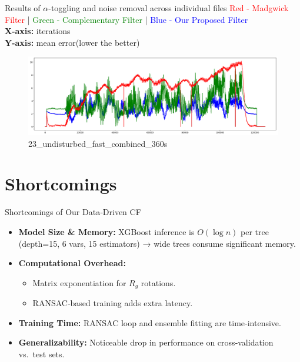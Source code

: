 \documentclass[aspectratio=169,xcolor=dvipsnames]{beamer}
\begin{document}
\begin{frame}{Results of $\alpha$-toggling and noise removal across individual files}
\small
\textcolor{red}{Red - Madgwick Filter} | \textcolor{green}{Green - Complementary Filter} | \textcolor{blue}{Blue - Our Proposed Filter} \\ 
\textbf{X-axis:} iterations \\ \textbf{Y-axis:} mean error(lower the better)

\begin{figure}
    \centering
    \includegraphics[width=1\linewidth]{logos/23_undisturbed_fast_combined_360s.png}
    \caption{23\_undisturbed\_fast\_combined\_360s}
    \label{fig:23_undisturbed360}
\end{figure}
\hfill
\end{frame}

\section{Shortcomings}

\begin{frame}{Shortcomings of Our Data‐Driven CF}
\begin{itemize}
  \item \textbf{Model Size \& Memory:}
    XGBoost inference is $O(\log n)$ per tree (depth=15, 6 vars, 15 estimators) → wide trees consume significant memory.
  \item \textbf{Computational Overhead:}
    \begin{itemize}
      \item Matrix exponentiation for $R_g$ rotations.
      \item RANSAC‐based training adds extra latency.
    \end{itemize}
  \item \textbf{Training Time:}
    RANSAC loop and ensemble fitting are time‐intensive.
  \item \textbf{Generalizability:}
    Noticeable drop in performance on cross‐validation vs.\ test sets.
\end{itemize}
\end{frame}
\end{document}
